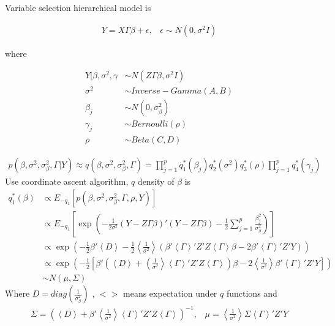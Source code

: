 \documentclass[11pt]{article}
\begin{document}
	Variable selection hierarchical model is
	
	\begin{align*}
	Y = X\Gamma\beta + \epsilon , \;\;\; \epsilon \sim N(0,\sigma^2 I)
	\end{align*}
	
	where 
	
	\begin{align*}
	Y|\beta,\sigma^2 ,\gamma &\sim N(Z\Gamma\beta , \sigma^2 I)\\
	\sigma^2 &\sim Inverse-Gamma(A,B)\\
	\beta_j &\sim N(0, \sigma_{\beta}^2)\\
	\gamma_j &\sim Bernoulli(\rho)\\
	\rho &\sim Beta(C,D)
	\end{align*}
	
	
	\begin{align*}
	p(\beta,\sigma^2,\sigma_\beta^2,\Gamma | Y) \approx q(\beta,\sigma^2,\sigma_\beta^2,\Gamma) = \prod_{j=1}^{p}q_1^*(\beta_j)q_2^*(\sigma^2) q_3^*(\rho)\prod_{j=1}^{p}q_4^*(\gamma_j)
	\end{align*}
	Use coordinate ascent algorithm, $q$ density of $\beta$ is
	\begin{align*}
	q_1^*(\beta) &\propto E_{-q_1}\left[p(\beta,\sigma^2,\sigma_\beta^2,\Gamma , \rho,Y)\right]\\
	&\propto E_{-q_1}\left[\exp\left(-\frac{1}{2\sigma^2}\left(Y - Z\Gamma\beta\right)'\left(Y-Z\Gamma\beta\right) - \frac{1}{2}\sum_{j=1}^{p}\frac{\beta_j^2}{\sigma_{\beta}^2}\right)\right]\\
	&\propto \exp\left(-\frac{1}{2} \beta'\left<D\right> -\frac{1}{2}\left<\frac{1}{\sigma^2}\right>\left(\beta'\left<\Gamma\right>'Z'Z\left<\Gamma\right>\beta- 2\beta'\left<\Gamma\right>'Z'Y\right)\right)\\
	&\propto \exp\left(-\frac{1}{2}\left[\beta'\left(\left<D\right> + \left<\frac{1}{\sigma^2}\right>\left<\Gamma\right>'Z'Z\left<\Gamma\right>\right)\beta -2 \left<\frac{1}{\sigma^2}\right>\beta'\left<\Gamma\right>'Z'Y\right]\right)\\
	&\sim N(\mu,\Sigma)
	\end{align*}
	Where $D = diag(\frac{1}{\sigma_{\beta}^2})$ , $<>$ means expectation under $q$ functions and
	\begin{align*}
	\Sigma = \left(\left<D\right> +\beta' \left<\frac{1}{\sigma^2}\right>\left<\Gamma\right>'Z'Z\left<\Gamma\right>\right)^{-1},\;\;\;\mu = \left<\frac{1}{\sigma^2}\right> \Sigma  \left<\Gamma\right>'Z'Y
	\end{align*}
\end{document}
